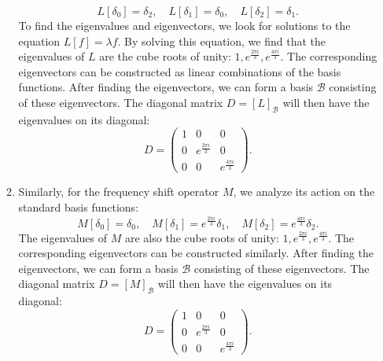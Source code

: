 \documentclass{article}
\begin{document}
\begin{enumerate}[(a)]
\begin{enumerate}[1.]
        \begin{equation*}
            L[\delta_0] = \delta_2, \quad L[\delta_1] = \delta_0, \quad L[\delta_2] = \delta_1.
        \end{equation*}
        To find the eigenvalues and eigenvectors, we look for solutions to the equation $L[f] = \lambda f$. By solving this equation, we find that the eigenvalues of $L$ are the cube roots of unity: $1, e^{\frac{2 \pi i}{3}}, e^{\frac{4 \pi i}{3}}$. The corresponding eigenvectors can be constructed as linear combinations of the basis functions. After finding the eigenvectors, we can form a basis $\mathscr{B}$ consisting of these eigenvectors. The diagonal matrix $D = [L]_{\mathscr{B}}$ will then have the eigenvalues on its diagonal:
        \begin{equation*}
            D = \begin{pmatrix}
                1 & 0 & 0 \\
                0 & e^{\frac{2 \pi i}{3}} & 0 \\
                0 & 0 & e^{\frac{4 \pi i}{3}}
            \end{pmatrix}.
        \end{equation*}
        \item Similarly, for the frequency shift operator $M$, we analyze its action on the standard basis functions:
        \begin{equation*}
            M[\delta_0] = \delta_0, \quad M[\delta_1] = e^{\frac{2 \pi i}{3}} \delta_1, \quad M[\delta_2] = e^{\frac{4 \pi i}{3}} \delta_2.
        \end{equation*}
        The eigenvalues of $M$ are also the cube roots of unity: $1, e^{\frac{2 \pi i}{3}}, e^{\frac{4 \pi i}{3}}$. The corresponding eigenvectors can be constructed similarly. After finding the eigenvectors, we can form a basis $\mathscr{B}$ consisting of these eigenvectors. The diagonal matrix $D = [M]_{\mathscr{B}}$ will then have the eigenvalues on its diagonal:
        \begin{equation*}
            D = \begin{pmatrix}
                1 & 0 & 0 \\
                0 & e^{\frac{2 \pi i}{3}} & 0 \\
                0 & 0 & e^{\frac{4 \pi i}{3}}
            \end{pmatrix}.
        \end{equation*}
    \end{enumerate}
\end{enumerate}
\end{document}
